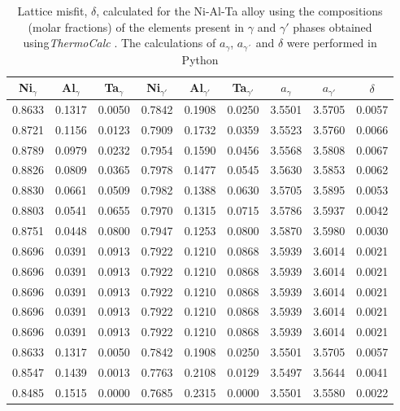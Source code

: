 \begin{table}[h]
    \centering
    \begin{tabular}{rrrrrrrrr}
        \multicolumn{1}{c}{Ni$_\gamma$} & \multicolumn{1}{c}{Al$_\gamma$} & \multicolumn{1}{c}{Ta$_\gamma$} & \multicolumn{1}{c}{Ni$_{\gamma'}$} & \multicolumn{1}{c}{Al$_{\gamma'}$} & \multicolumn{1}{c}{Ta$_{\gamma'}$} & \multicolumn{1}{c}{$a_\gamma$} & \multicolumn{1}{c}{$a_{\gamma'}$} & \multicolumn{1}{c}{$\delta$} \\ \hline \hline
        0.8633 & 0.1317 & 0.0050 & 0.7842 & 0.1908 & 0.0250 & 3.5501 & 3.5705 & 0.0057 \\0.8721 & 0.1156 & 0.0123 & 0.7909 & 0.1732 & 0.0359 & 3.5523 & 3.5760 & 0.0066 \\0.8789 & 0.0979 & 0.0232 & 0.7954 & 0.1590 & 0.0456 & 3.5568 & 3.5808 & 0.0067 \\0.8826 & 0.0809 & 0.0365 & 0.7978 & 0.1477 & 0.0545 & 3.5630 & 3.5853 & 0.0062 \\0.8830 & 0.0661 & 0.0509 & 0.7982 & 0.1388 & 0.0630 & 3.5705 & 3.5895 & 0.0053 \\0.8803 & 0.0541 & 0.0655 & 0.7970 & 0.1315 & 0.0715 & 3.5786 & 3.5937 & 0.0042 \\0.8751 & 0.0448 & 0.0800 & 0.7947 & 0.1253 & 0.0800 & 3.5870 & 3.5980 & 0.0030 \\0.8696 & 0.0391 & 0.0913 & 0.7922 & 0.1210 & 0.0868 & 3.5939 & 3.6014 & 0.0021 \\0.8696 & 0.0391 & 0.0913 & 0.7922 & 0.1210 & 0.0868 & 3.5939 & 3.6014 & 0.0021 \\0.8696 & 0.0391 & 0.0913 & 0.7922 & 0.1210 & 0.0868 & 3.5939 & 3.6014 & 0.0021 \\0.8696 & 0.0391 & 0.0913 & 0.7922 & 0.1210 & 0.0868 & 3.5939 & 3.6014 & 0.0021 \\0.8696 & 0.0391 & 0.0913 & 0.7922 & 0.1210 & 0.0868 & 3.5939 & 3.6014 & 0.0021 \\0.8633 & 0.1317 & 0.0050 & 0.7842 & 0.1908 & 0.0250 & 3.5501 & 3.5705 & 0.0057 \\0.8547 & 0.1439 & 0.0013 & 0.7763 & 0.2108 & 0.0129 & 3.5497 & 3.5644 & 0.0041 \\0.8485 & 0.1515 & 0.0000 & 0.7685 & 0.2315 & 0.0000 & 3.5501 & 3.5580 & 0.0022
    \end{tabular}
    \caption{Lattice misfit, $\delta$, calculated for the Ni-Al-Ta alloy using the compositions (molar fractions) of the elements present in $\gamma$ and $\gamma'$ phases obtained using\textit{ThermoCalc} \citep{thermocalc}. The calculations of $a_\gamma$, $a_{\gamma´}$ and $\delta$ were performed in Python \citep{mygit}}
    \label{tab:tab03}
\end{table}

